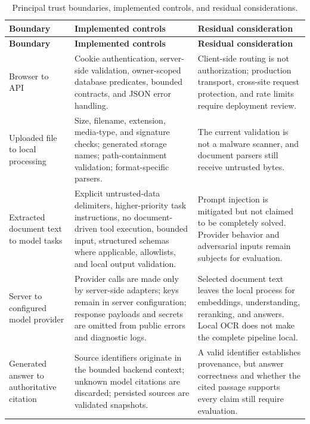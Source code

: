 {\small
\begin{longtable}{@{}L{3.1cm}L{6.3cm}L{4.6cm}@{}}
\caption[Security boundaries]{Principal trust boundaries, implemented controls, and residual considerations.}
\label{tab:security-boundaries}\\
\toprule
\textbf{Boundary} & \textbf{Implemented controls} & \textbf{Residual consideration} \\
\midrule
\endfirsthead
\toprule
\textbf{Boundary} & \textbf{Implemented controls} & \textbf{Residual consideration} \\
\midrule
\endhead
\bottomrule
\endfoot
Browser to API &
Cookie authentication, server-side validation, owner-scoped database
predicates, bounded contracts, and JSON error handling. &
Client-side routing is not authorization; production transport, cross-site
request protection, and rate limits require deployment review. \\

Uploaded file to local processing &
Size, filename, extension, media-type, and signature checks; generated storage
names; path-containment validation; format-specific parsers. &
The current validation is not a malware scanner, and document parsers still
receive untrusted bytes. \\

Extracted document text to model tasks &
Explicit untrusted-data delimiters, higher-priority task instructions, no
document-driven tool execution, bounded input, structured schemas where
applicable, allowlists, and local output validation. &
Prompt injection is mitigated but not claimed to be completely solved.
Provider behavior and adversarial inputs remain subjects for evaluation. \\

Server to configured model provider &
Provider calls are made only by server-side adapters; keys remain in server
configuration; response payloads and secrets are omitted from public errors and
diagnostic logs. &
Selected document text leaves the local process for embeddings, understanding,
reranking, and answers. Local OCR does not make the complete pipeline local. \\

Generated answer to authoritative citation &
Source identifiers originate in the bounded backend context; unknown model
citations are discarded; persisted sources are validated snapshots. &
A valid identifier establishes provenance, but answer correctness and whether
the cited passage supports every claim still require evaluation. \\
\end{longtable}
}

